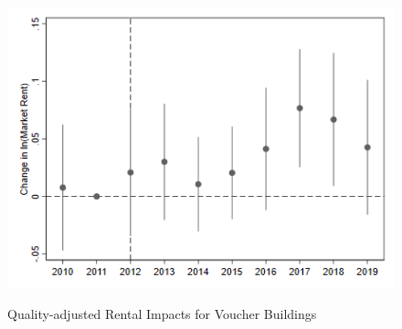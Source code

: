 \documentclass[12pt]{article}
\begin{document}
{{{{{{\begin{figure}[h!]
\caption{Quality-adjusted Rental Impacts for Voucher Buildings}
\begin{center}
\includegraphics[scale = 0.6]{Street Easy Rents/R21 Voucher Build SE High Surge Rent Impacts.png}
\label{fig:sevouch}
\end{center}
\end{figure}




}}}}}}
\end{document}
